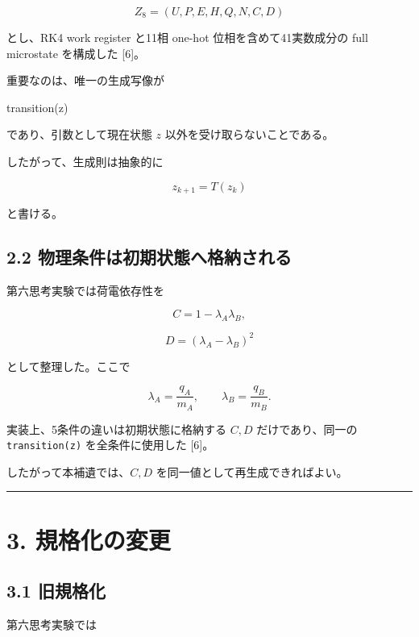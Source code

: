 \documentclass[
  a4paper,
]{ltjsarticle}
\newenvironment{Shaded}{}{}
\newcommand{\NormalTok}[1]{#1}
\begin{document}
\[
Z_8=(U,P,E,H,Q,N,C,D)
\]

とし、RK4 work register と11相 one-hot 位相を含めて41実数成分の full
microstate を構成した {[}6{]}。

重要なのは、唯一の生成写像が

\begin{Shaded}
\begin{Highlighting}[]
\NormalTok{transition(z)}
\end{Highlighting}
\end{Shaded}

であり、引数として現在状態 \(z\) 以外を受け取らないことである。

したがって、生成則は抽象的に

\[
\boxed{z_{k+1}=T(z_k)}
\]

と書ける。

\subsection{2.2
物理条件は初期状態へ格納される}\label{ux7269ux7406ux6761ux4ef6ux306fux521dux671fux72b6ux614bux3078ux683cux7d0dux3055ux308cux308b}

第六思考実験では荷電依存性を

\[
C=1-\lambda_A\lambda_B,
\]

\[
D=(\lambda_A-\lambda_B)^2
\]

として整理した。ここで

\[
\lambda_A=\frac{q_A}{m_A},\qquad
\lambda_B=\frac{q_B}{m_B}.
\]

実装上、5条件の違いは初期状態に格納する \(C,D\) だけであり、同一の
\texttt{transition(z)} を全条件に使用した {[}6{]}。

したがって本補遺では、\(C,D\) を同一値として再生成できればよい。

\begin{center}\rule{0.5\linewidth}{0.5pt}\end{center}

\section{3. 規格化の変更}\label{ux898fux683cux5316ux306eux5909ux66f4}

\subsection{3.1 旧規格化}\label{ux65e7ux898fux683cux5316}

第六思考実験では
\end{document}
